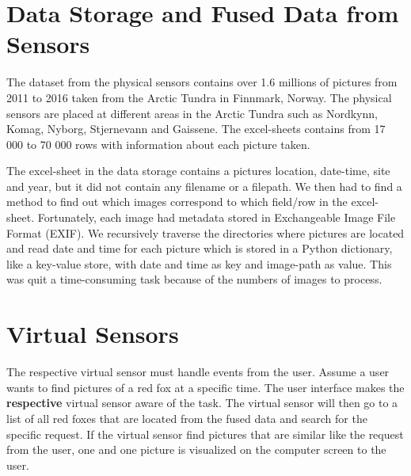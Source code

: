 \documentclass[USenglish]{uit-thesis}
\begin{document}
\section{Data Storage and Fused Data from Sensors} \label{ssec:des_fused}
The dataset from the physical sensors contains over 1.6 millions of pictures from 2011 to 2016 taken from the Arctic Tundra in Finnmark, Norway. The physical sensors are placed at different areas in the Arctic Tundra such as Nordkynn, Komag, Nyborg, Stjernevann and Gaissene.
The excel-sheets contains from 17 000 to 70 000 rows with information about each picture taken.

The excel-sheet in the data storage contains a pictures location, date-time, site and year, but it did not contain any filename or a filepath. We then had to find a method to find out which images correspond to which field/row in the excel-sheet. Fortunately, each image had metadata stored in Exchangeable Image File Format (EXIF). We recursively traverse the directories where pictures are located and read date and time for each picture which is stored in a Python dictionary, like a key-value store, with date and time as key and image-path as value. This was quit a time-consuming task because of the numbers of images to process.





\section{Virtual Sensors}
The respective virtual sensor must handle events from the user. Assume a user wants to find pictures of a red fox at a specific time.  The user interface makes the \textbf{respective} virtual sensor aware of the task. The virtual sensor will then go to a list of all red foxes that are located from the fused data and search for the specific request. If the virtual sensor find pictures that are similar like the request from the user, one and one picture is visualized on the computer screen to the user.
\end{document}

